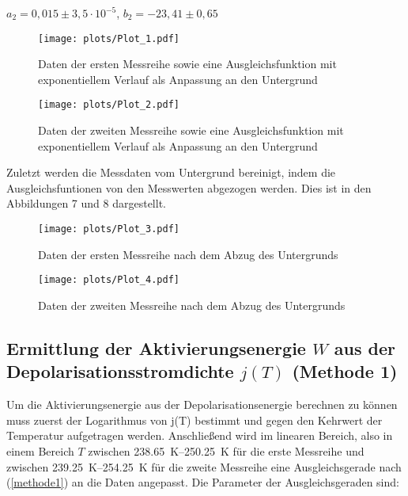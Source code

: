 \begin{center}
$a_2=0,015 \pm 3,5 \cdot 10^{-5}$, $b_2=-23,41 \pm 0,65$
\end{center}


  \begin{figure}
  \centering
  \texttt{[image: plots/Plot\_1.pdf]}
  \caption{Daten der ersten Messreihe sowie eine Ausgleichsfunktion mit exponentiellem Verlauf als Anpassung an den Untergrund}
  \label{fig:plot1}
\end{figure}

\begin{figure}
  \centering
  \texttt{[image: plots/Plot\_2.pdf]}
  \caption{Daten der zweiten Messreihe sowie eine Ausgleichsfunktion mit exponentiellem Verlauf als Anpassung an den Untergrund}
  \label{fig:plot2}
\end{figure}

\newpage

Zuletzt werden die Messdaten vom Untergrund bereinigt, indem die Ausgleichsfuntionen von den Messwerten abgezogen werden.
Dies ist in den Abbildungen 7 und 8 dargestellt.

\begin{figure}[H]
  \centering
  \texttt{[image: plots/Plot\_3.pdf]}
  \caption{Daten der ersten Messreihe nach dem Abzug des Untergrunds}
  \label{fig:plot3}
\end{figure}

\begin{figure}[H]
  \centering
  \texttt{[image: plots/Plot\_4.pdf]}
  \caption{Daten der zweiten Messreihe nach dem Abzug des Untergrunds}
  \label{fig:plot4}
\end{figure}

\newpage
\subsection{Ermittlung der Aktivierungsenergie $W$ aus der Depolarisationsstromdichte $j(T)$ (Methode 1)}

Um die Aktivierungsenergie aus der Depolarisationsenergie berechnen zu können muss zuerst der Logarithmus von j(T) bestimmt und gegen den Kehrwert der Temperatur aufgetragen werden. Anschließend wird im linearen Bereich, also in einem Bereich
$T$ zwischen \SIrange{238,65}{250,25}{\kelvin} für die erste Messreihe und zwischen \SIrange{239,25}{254,25}{\kelvin} für die zweite Messreihe eine Ausgleichsgerade nach (\ref{methode1}) an die Daten angepasst. Die Parameter der Ausgleichsgeraden sind:

